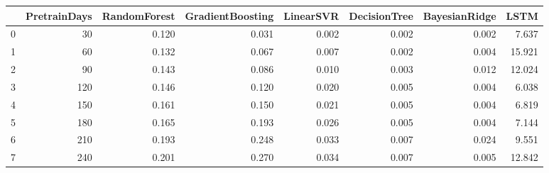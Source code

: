 \begin{tabular}{lrrrrrrr}
\toprule
{} &  PretrainDays &  RandomForest &  GradientBoosting &  LinearSVR &  DecisionTree &  BayesianRidge &   LSTM \\
\midrule
0 &            30 &         0.120 &             0.031 &      0.002 &         0.002 &          0.002 &  7.637 \\
1 &            60 &         0.132 &             0.067 &      0.007 &         0.002 &          0.004 & 15.921 \\
2 &            90 &         0.143 &             0.086 &      0.010 &         0.003 &          0.012 & 12.024 \\
3 &           120 &         0.146 &             0.120 &      0.020 &         0.005 &          0.004 &  6.038 \\
4 &           150 &         0.161 &             0.150 &      0.021 &         0.005 &          0.004 &  6.819 \\
5 &           180 &         0.165 &             0.193 &      0.026 &         0.005 &          0.004 &  7.144 \\
6 &           210 &         0.193 &             0.248 &      0.033 &         0.007 &          0.024 &  9.551 \\
7 &           240 &         0.201 &             0.270 &      0.034 &         0.007 &          0.005 & 12.842 \\
\bottomrule
\end{tabular}
